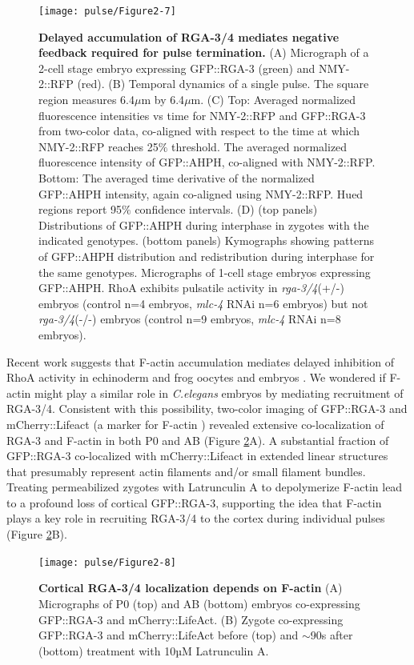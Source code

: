 \begin{figure}[!htbp]
\centering
\texttt{[image: pulse/Figure2-7]}

\caption{\label{fig:227}\textbf{Delayed accumulation of RGA-3/4 mediates negative feedback required for pulse termination.} (A) Micrograph of a 2-cell stage embryo expressing GFP::RGA-3 (green) and NMY-2::RFP (red). (B) Temporal dynamics of a single pulse. The square region measures 6.4$\mu$m by 6.4$\mu$m. (C) Top: Averaged normalized fluorescence intensities vs time for NMY-2::RFP and GFP::RGA-3 from two-color data, co-aligned with respect to the time at which NMY-2::RFP reaches 25$\%$ threshold. The averaged normalized fluorescence intensity of GFP::AHPH, co-aligned with NMY-2::RFP.  Bottom: The averaged time derivative of the normalized GFP::AHPH intensity, again co-aligned using NMY-2::RFP.  Hued regions report 95$\%$ confidence intervals. (D) (top panels) Distributions of GFP::AHPH during interphase in zygotes  with the indicated genotypes.  (bottom panels) Kymographs showing patterns of GFP::AHPH distribution and redistribution during interphase for the same genotypes. Micrographs of 1-cell stage embryos expressing GFP::AHPH. RhoA exhibits pulsatile activity in \textit{rga-3/4}(+/-) embryos (control n=4 embryos, \textit{mlc-4} RNAi n=6 embryos) but not \textit{rga-3/4}(-/-) embryos (control n=9 embryos, \textit{mlc-4} RNAi n=8 embryos).}
\end{figure}

Recent work suggests that F-actin accumulation mediates delayed inhibition of RhoA activity in echinoderm and frog oocytes and embryos \cite{Bement:2015jp}.  We wondered if F-actin might play a similar role in \textit{C.elegans} embryos by mediating recruitment of RGA-3/4.  Consistent with this possibility, two-color imaging of GFP::RGA-3 and mCherry::Lifeact  (a marker for F-actin  \cite{Pohl:2012bg}) revealed extensive co-localization of RGA-3 and F-actin in both P0 and AB (Figure \ref{fig:228}A).  A substantial fraction of GFP::RGA-3 co-localized with mCherry::Lifeact in extended linear structures that presumably represent actin filaments and/or small filament bundles. Treating permeabilized zygotes \cite{Carvalho:2011ce, Olson:2012cs} with Latrunculin A to depolymerize F-actin lead to a profound loss of cortical GFP::RGA-3, supporting the idea that F-actin plays a key role in recruiting RGA-3/4 to the cortex during individual pulses (Figure \ref{fig:228}B).




\begin{figure}[!htbp]
\centering
\texttt{[image: pulse/Figure2-8]}

\caption{\label{fig:228}\textbf{Cortical RGA-3/4 localization depends on F-actin} (A) Micrographs of P0 (top) and AB (bottom) embryos co-expressing GFP::RGA-3 and mCherry::LifeAct. (B) Zygote co-expressing GFP::RGA-3 and mCherry::LifeAct before (top) and $\sim$90s after (bottom) treatment with 10µM Latrunculin A.}
\end{figure}



